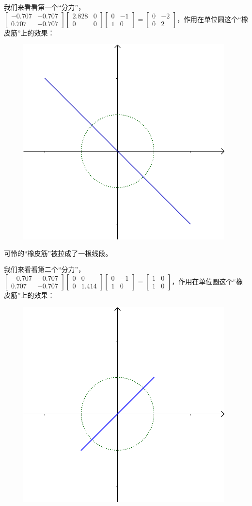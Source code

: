 \documentclass[12pt]{article}
\begin{document}
我们来看看第一个“分力”，$\begin{bmatrix}-0.707&-0.707\\0.707&-0.707\end{bmatrix}\begin{bmatrix}2.828&0\\0&0\end{bmatrix}\begin{bmatrix}0&-1\\1&0\end{bmatrix}=\begin{bmatrix}0&-2\\0&2\end{bmatrix}$，作用在单位圆这个“橡皮筋”上的效果：
\begin{figure}[H]
    \centering
    \includegraphics[width=.3\textwidth]{fig/UnderstandSingularValue_3.png}
\end{figure} 

可怜的“橡皮筋”被拉成了一根线段。

我们来看看第二个“分力”，$\begin{bmatrix}-0.707&-0.707\\0.707&-0.707\end{bmatrix}\begin{bmatrix}0&0\\0&1.414\end{bmatrix}\begin{bmatrix}0&-1\\1&0\end{bmatrix}=\begin{bmatrix}1&0\\1&0\end{bmatrix}$，作用在单位圆这个“橡皮筋”上的效果：
\begin{figure}[H]
    \centering
    \includegraphics[width=.3\textwidth]{fig/UnderstandSingularValue_4.png}
\end{figure} 
\end{document}
